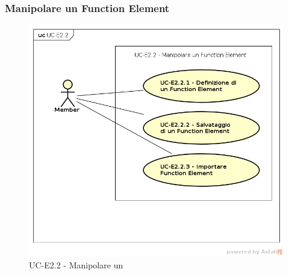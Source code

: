 \subsubsection{Manipolare un Function Element}
    \begin{figure}[H]
      \begin{center}
        \includegraphics[width=12cm]{res/img/UCEditor/UC-E2.2.png}
      \caption{UC-E2.2 - Manipolare un }
      \end{center} 
    \end{figure}

